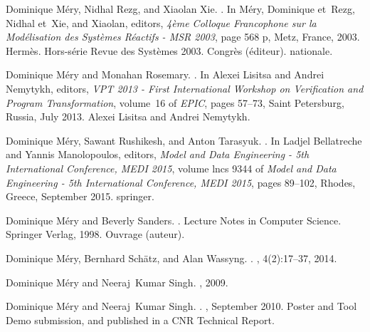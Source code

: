 \documentclass[ 12pt]{article}
\begin{document}
\begin{thebibliography}{100}
Dominique M{\'e}ry, Nidhal Rezg, and Xiaolan Xie.
.
\newblock In M{\'e}ry, Dominique et~Rezg, Nidhal et~Xie, and Xiaolan, editors,
  {\em {4{\`e}me Colloque Francophone sur la Mod{\'e}lisation des Syst{\`e}mes
  R{\'e}actifs - MSR 2003}}, page 568 p, Metz, France, 2003. {Herm{\`e}s}.
\newblock Hors-s{\'e}rie Revue des Syst{\`e}mes 2003. Congr{\`e}s
  ({\'e}diteur). nationale.

Dominique M{\'e}ry and Monahan Rosemary.
.
\newblock In Alexei Lisitsa and Andrei Nemytykh, editors, {\em {VPT 2013 -
  First International Workshop on Verification and Program Transformation}},
  volume~16 of {\em EPIC}, pages 57--73, Saint Petersburg, Russia, July 2013.
  {Alexei Lisitsa and Andrei Nemytykh}.

Dominique M{\'e}ry, Sawant Rushikesh, and Anton Tarasyuk.
.
\newblock In Ladjel Bellatreche and Yannis Manolopoulos, editors, {\em {Model
  and Data Engineering - 5th International Conference, MEDI 2015}}, volume lncs
  9344 of {\em Model and Data Engineering - 5th International Conference, MEDI
  2015}, pages 89--102, Rhodes, Greece, September 2015. {springer}.

Dominique M{\'e}ry and Beverly Sanders.
.
\newblock Lecture Notes in Computer Science. {Springer Verlag}, 1998.
\newblock Ouvrage (auteur).

Dominique M{\'e}ry, Bernhard Sch{\"a}tz, and Alan Wassyng.
.
, 4(2):17--37, 2014.

Dominique M{\'e}ry and Neeraj~Kumar Singh.
, 2009.

Dominique M{\'e}ry and Neeraj~Kumar Singh.
.
, September 2010.
\newblock Poster and Tool Demo submission, and published in a CNR Technical
  Report.


\end{thebibliography}
\end{document}
